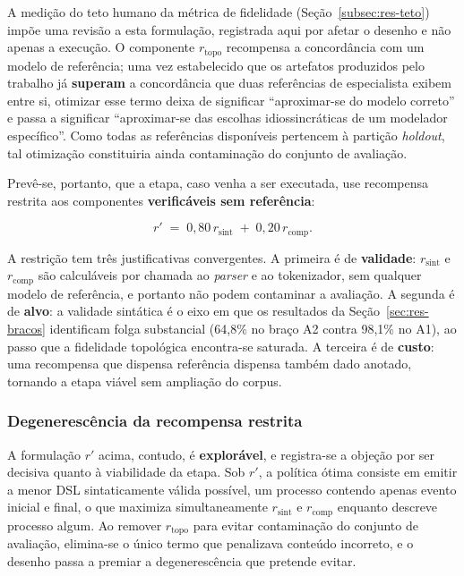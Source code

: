 A medição do teto humano da métrica de fidelidade (Seção~\ref{subsec:res-teto}) impõe uma revisão a esta formulação, registrada aqui por afetar o desenho e não apenas a execução. O componente $r_{\text{topo}}$ recompensa a concordância com um modelo de referência; uma vez estabelecido que os artefatos produzidos pelo trabalho já \textbf{superam} a concordância que duas referências de especialista exibem entre si, otimizar esse termo deixa de significar ``aproximar-se do modelo correto'' e passa a significar ``aproximar-se das escolhas idiossincráticas de um modelador específico''. Como todas as referências disponíveis pertencem à partição \textit{holdout}, tal otimização constituiria ainda contaminação do conjunto de avaliação.

Prevê-se, portanto, que a etapa, caso venha a ser executada, use recompensa restrita aos componentes \textbf{verificáveis sem referência}:

\begin{equation}
	r' \;=\; 0{,}80\, r_{\text{sint}} \;+\; 0{,}20\, r_{\text{comp}}.
\end{equation}

A restrição tem três justificativas convergentes. A primeira é de \textbf{validade}: $r_{\text{sint}}$ e $r_{\text{comp}}$ são calculáveis por chamada ao \textit{parser} e ao tokenizador, sem qualquer modelo de referência, e portanto não podem contaminar a avaliação. A segunda é de \textbf{alvo}: a validade sintática é o eixo em que os resultados da Seção~\ref{sec:res-bracos} identificam folga substancial (64,8\% no braço A2 contra 98,1\% no A1), ao passo que a fidelidade topológica encontra-se saturada. A terceira é de \textbf{custo}: uma recompensa que dispensa referência dispensa também dado anotado, tornando a etapa viável sem ampliação do corpus.

\subsubsection*{Degenerescência da recompensa restrita}

A formulação $r'$ acima, contudo, é \textbf{explorável}, e registra-se a objeção por ser decisiva quanto à viabilidade da etapa. Sob $r'$, a política ótima consiste em emitir a menor DSL sintaticamente válida possível, um processo contendo apenas evento inicial e final, o que maximiza simultaneamente $r_{\text{sint}}$ e $r_{\text{comp}}$ enquanto descreve processo algum. Ao remover $r_{\text{topo}}$ para evitar contaminação do conjunto de avaliação, elimina-se o único termo que penalizava conteúdo incorreto, e o desenho passa a premiar a degenerescência que pretende evitar.

